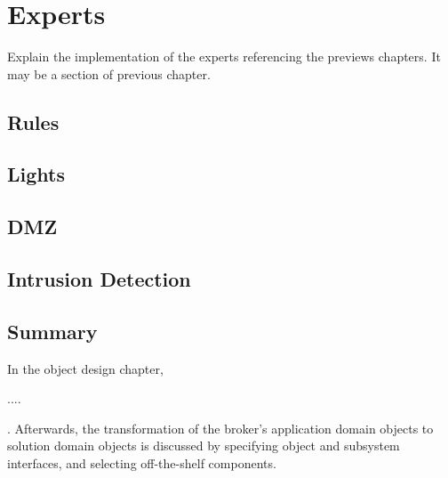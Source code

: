 
\chapter{Experts}

Explain the implementation of the experts referencing the previews chapters. It may be a section of previous chapter.

\section{Rules}

\section{Lights}

\section{DMZ}

\section{Intrusion Detection}


\section{Summary}

In the object design chapter, 

....

. Afterwards, the transformation of the broker's application domain objects to solution domain objects is discussed by specifying object and subsystem interfaces, and selecting off-the-shelf components.
